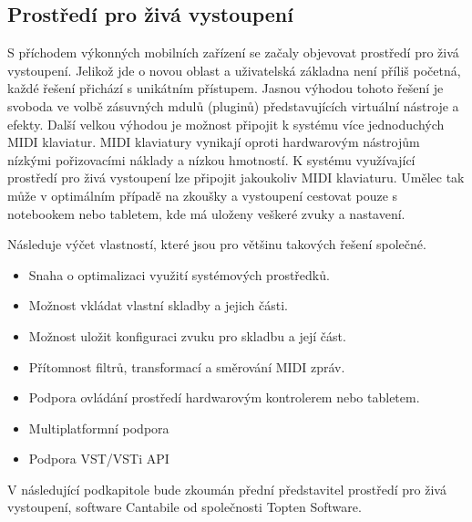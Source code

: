 \documentclass[thesis=M,czech]{FITthesis}[2019/03/06]
\begin{document}
	\subsection{Prostředí pro živá vystoupení}
	S příchodem výkonných mobilních zařízení se začaly objevovat prostředí pro živá vystoupení.
	Jelikož jde o novou oblast a uživatelská základna není příliš početná, každé řešení přichází s unikátním přístupem. 
	Jasnou výhodou tohoto řešení je svoboda ve volbě  zásuvných mdulů (pluginů)
	představujících virtuální nástroje a efekty.
	Další velkou výhodou je možnost připojit
	k systému více jednoduchých MIDI klaviatur.
	MIDI klaviatury vynikají oproti hardwarovým nástrojům
	nízkými pořizovacími náklady a nízkou hmotností.
	K systému využívající prostředí pro živá vystoupení
	lze připojit jakoukoliv MIDI klaviaturu. Umělec
	tak může v optimálním případě na zkoušky a vystoupení cestovat pouze s notebookem nebo tabletem, kde má uloženy veškeré zvuky a nastavení.
	
	Následuje výčet vlastností, které jsou pro většinu takových řešení společné.
	
	\begin{itemize}
		\item Snaha o optimalizaci využití systémových prostředků.
		\item Možnost vkládat vlastní skladby a jejich části.
		\item Možnost uložit konfiguraci zvuku pro skladbu a její část.
		\item Přítomnost filtrů, transformací a směrování MIDI zpráv.
		\item Podpora ovládání prostředí hardwarovým kontrolerem nebo tabletem.
		\item Multiplatformní podpora
		\item Podpora VST/VSTi API
	\end{itemize}
	
	V následující podkapitole bude zkoumán přední představitel prostředí pro živá vystoupení,
	software Cantabile od společnosti Topten Software.
	
\end{document}

